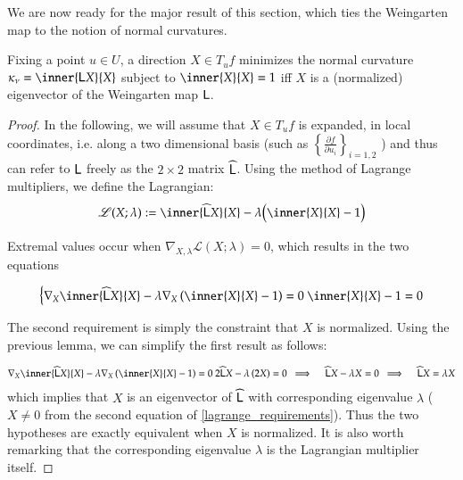     We are now ready for the major result of this section, which ties the Weingarten map to the
    notion of normal curvatures.
    
    \begin{theorem}
       	Fixing a point $u \in U$, a direction $X \in T_u f $ minimizes the normal curvature $\kappa_\nu = \inner{\wein X}{X}$ subject to $\inner{X}{X}= 1$
       	iff $X$ is a (normalized) eigenvector of the Weingarten map $\mathsf{L}$.
       	\end{theorem}
    \begin{proof}
       		
       		In the following, we will assume that $X \in T_u f$ is expanded,
       		in local coordinates, i.e. along  a two dimensional basis
       		(such as $\left\{ \frac{\partial f}{\partial u_i}\right\}_{i=1,2}$
       		) and thus can refer to $\mathsf{L}$ freely as the $2\times2$ matrix $\widehat{\mathsf{L}}$.
       		Using the method of Lagrange multipliers, we define the Lagrangian:
       		\begin{equation}
       		\mathscr{L}(X; \lambda) :=
        	\inner{\weinmat X}{X} - \lambda\Big(\inner{X}{X} - 1\Big) 
     \end{equation}
        	
        	Extremal values occur when
        	$\nabla_{X,\lambda} \mathscr{L}(X;\lambda) = 0$,
        	which results in the two equations
        	
     \begin{equation} \label{lagrange_requirements}
     \left\{ \begin{aligned}
      \nabla_X \inner{\weinmat X}{X} - \lambda \nabla_X \left( \inner{X}{X} - 1 \right) = 0 \
      \inner{X}{X} - 1 = 0
     \end{aligned} \right.
     \end{equation}
     
     The second requirement is simply the constraint that $X$ is normalized.
     Using the previous lemma, we can simplify the first result as follows:
     
     \begin{gather}
     \nabla_X \inner{\weinmat X}{X} - \lambda \nabla_X \left( \inner{X}{X} - 1 \right) = 0 
     \nonumber \
     2\weinmat X - \lambda \left(2 X \right) = 0  \nonumber \
     \implies \quad \weinmat X - \lambda X = 0 \nonumber \
     \implies \quad \weinmat X = \lambda X
     \end{gather}
     which implies that $X$ is an eigenvector of  $\widehat{\mathsf{L}}$ with corresponding eigenvalue $\lambda$ ($X\ne 0 $ from the second equation of \cref{lagrange_requirements}).
     Thus the two hypotheses are exactly equivalent when $X$ is normalized. It is also worth remarking that the corresponding eigenvalue $\lambda$ is the Lagrangian multiplier itself.
       	\end{proof}
       	
